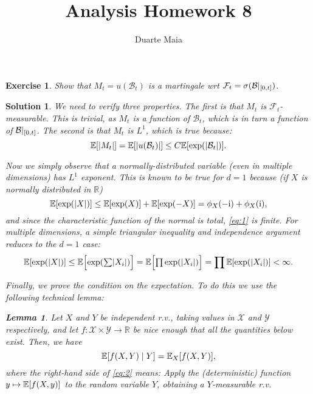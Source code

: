 \documentclass{article}
\title{Analysis Homework 8}
\author{Duarte Maia}
\newtheorem{lemma}{Lemma}
\newtheorem{ex}{Exercise}
\theoremstyle{nonumberplain}
\newtheorem{sol}{Solution}
\newcommand{\R}{\mathbb{R}}
\newcommand{\I}{\mathrm{i}}
\DeclarePairedDelimiter{\abs}{\lvert}{\rvert}
\DeclarePairedDelimiter{\bparens}{[}{]}
\newcommand{\EVg}{\mathbb{E}}
\newcommand{\EV}{\EVg\bparens}
\newcommand{\Brwn}{\mathcal{B}}
\newcommand{\sa}[1]{\mathcal{#1}}
\begin{document}
\maketitle

\begin{ex}
Show that $M_t = u(\Brwn_t)$ is a martingale wrt $\sa F_t = \sigma(\Brwn|_{\interval0t})$.
\end{ex}

\begin{sol}
We need to verify three properties. The first is that $M_t$ is $\sa F_t$-measurable. This is trivial, as $M_t$ is a function of $\Brwn_t$, which is in turn a function of $\Brwn|_{\interval0t}$. The second is that $M_t$ is $L^1$, which is true because:
\begin{equation}
\EV{\abs{M_t}} = \EV{\abs{u(\Brwn_t)}} \leq C \EV{\exp(\abs{\Brwn_t})}.
\end{equation}

Now we simply observe that a normally-distributed variable (even in multiple dimensions) has $L^1$ exponent. This is known to be true for $d = 1$ because (if $X$ is normally distributed in $\R$)
\begin{equation}\label{eq:1}
\EV{\exp(\abs X)} \leq \EV{\exp(X)} + \EV{\exp(-X)} = \phi_X(-\I) + \phi_X(\I),
\end{equation}
and since the characteristic function of the normal is total, \eqref{eq:1} is finite. For multiple dimensions, a simple triangular inequality and independence argument reduces to the $d = 1$ case:
\begin{equation}
\EV{\exp(\abs X)} \leq \EV[\Big]{\exp({\textstyle\sum} \abs{X_i})} = \EV[\Big]{{\textstyle\prod} \exp(\abs{X_i})} = \prod \EV{\exp(\abs{X_i})} < \infty.
\end{equation}

Finally, we prove the condition on the expectation. To do this we use the following technical lemma:
\begin{lemma}
Let $X$ and $Y$ be independent r.v., taking values in $\mathcal{X}$ and $\mathcal{Y}$ respectively, and let $f \colon \mathcal{X} \times \mathcal{Y} \to \R$ be nice enough that all the quantities below exist. Then, we have
\begin{equation}\label{eq:2}
\EV{f(X,Y) \mid Y} = \EVg_X[f(X,Y)],
\end{equation}
where the right-hand side of \eqref{eq:2} means: Apply the (deterministic) function $y \mapsto \EV{f(X,y)}$ to the random variable $Y$, obtaining a $Y$-measurable r.v.
\end{lemma}


\end{sol}
\end{document}
